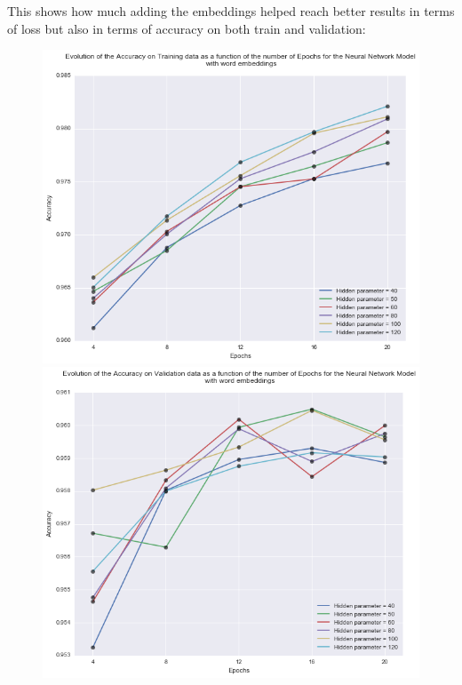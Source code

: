 \documentclass[11pt]{article}
\begin{document}
\noindent This shows how much adding the embeddings helped reach better results in terms of loss but also in terms of accuracy on both train and validation:

\begin{figure}[H]
\centering
\begin{minipage}{.4\textwidth}
  \centering
  \includegraphics[width=1.2\linewidth]{train_nn}
\end{minipage} 
\hfill
\begin{minipage}{.4\textwidth}
  \centering
  \includegraphics[width=1.2\linewidth]{valid_nn}
\end{minipage}
\end{figure}
\end{document}
